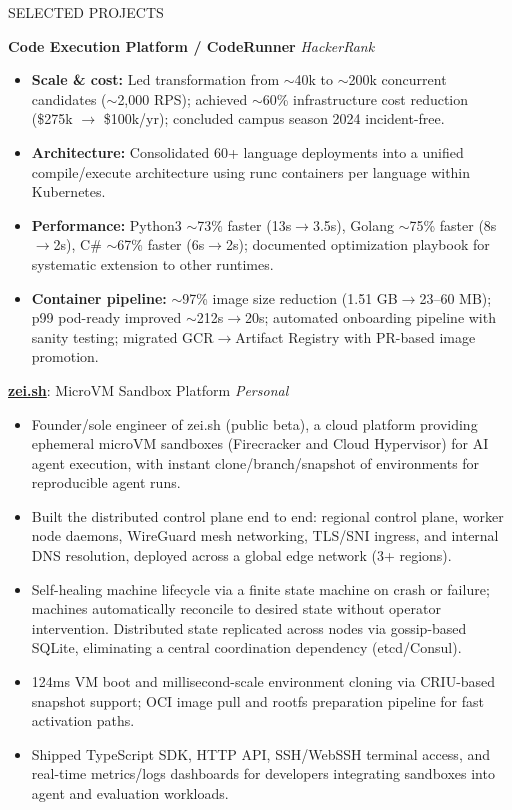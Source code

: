 \documentclass{resume} %
\begin{document}
\begin{rSection}{SELECTED PROJECTS}

\textbf{Code Execution Platform / CodeRunner} \hfill \textit{HackerRank}
\begin{itemize}
   \itemsep -3pt {}
    \item \textbf{Scale \& cost:} Led transformation from $\sim$40k to $\sim$200k concurrent candidates ($\sim$2,000 RPS); achieved $\sim$60\% infrastructure cost reduction (\$275k $\rightarrow$ \$100k/yr); concluded campus season 2024 incident-free.
    \item \textbf{Architecture:} Consolidated 60+ language deployments into a unified compile/execute architecture using runc containers per language within Kubernetes.
    \item \textbf{Performance:} Python3 $\sim$73\% faster (13s$\rightarrow$3.5s), Golang $\sim$75\% faster (8s$\rightarrow$2s), C\# $\sim$67\% faster (6s$\rightarrow$2s); documented optimization playbook for systematic extension to other runtimes.
    \item \textbf{Container pipeline:} $\sim$97\% image size reduction (1.51 GB$\rightarrow$23--60 MB); p99 pod-ready improved $\sim$212s$\rightarrow$20s; automated onboarding pipeline with sanity testing; migrated GCR$\rightarrow$Artifact Registry with PR-based image promotion.
\end{itemize}


\href{https://zei.sh}{\textbf{zei.sh}}: MicroVM Sandbox Platform \hfill \textit{Personal}
\begin{itemize}
   \itemsep -3pt {}
    \item Founder/sole engineer of zei.sh (public beta), a cloud platform providing ephemeral microVM sandboxes (Firecracker and Cloud Hypervisor) for AI agent execution, with instant clone/branch/snapshot of environments for reproducible agent runs.
    \item Built the distributed control plane end to end: regional control plane, worker node daemons, WireGuard mesh networking, TLS/SNI ingress, and internal DNS resolution, deployed across a global edge network (3+ regions).
    \item Self-healing machine lifecycle via a finite state machine on crash or failure; machines automatically reconcile to desired state without operator intervention. Distributed state replicated across nodes via gossip-based SQLite, eliminating a central coordination dependency (etcd/Consul).
    \item 124ms VM boot and millisecond-scale environment cloning via CRIU-based snapshot support; OCI image pull and rootfs preparation pipeline for fast activation paths.
    \item Shipped TypeScript SDK, HTTP API, SSH/WebSSH terminal access, and real-time metrics/logs dashboards for developers integrating sandboxes into agent and evaluation workloads.
\end{itemize}

\end{rSection}
\end{document}
